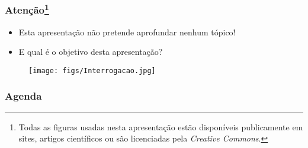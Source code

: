 \begin{frame}
    \frametitle{Atenção\footnote{Todas as figuras usadas nesta apresentação estão disponíveis publicamente em sites, artigos científicos ou são licenciadas pela \textit{Creative Commons}.}}
    \begin{itemize}
        \item Esta apresentação não pretende aprofundar nenhum tópico!
        \item E qual é o objetivo desta apresentação?
    \end{itemize}
    \begin{figure}
        \centering
        \texttt{[image: figs/Interrogacao.jpg]}
    \end{figure}
    \vspace{1.7cm}
\end{frame}

\begin{frame}
    \frametitle{Agenda}
    \tableofcontents
\end{frame}